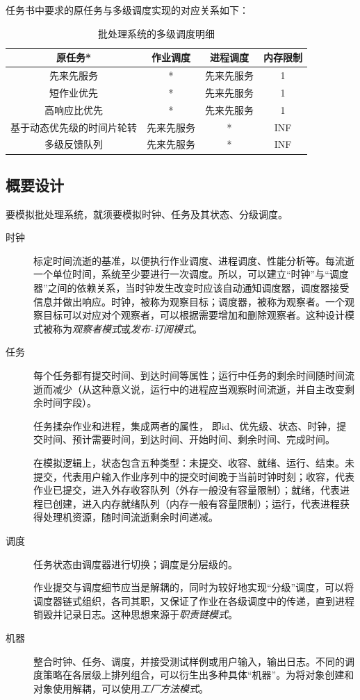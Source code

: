 \documentclass[UTF8]{ctexart}
\begin{document}
任务书中要求的原任务与多级调度实现的对应关系如下：
\begin{table}[htbp]
    \caption{批处理系统的多级调度明细}
    \centering
    \begin{tabular}{cccc}
        \toprule
        原任务*          & 作业调度  & 进程调度  & 内存限制 \\
        \midrule
        先来先服务         & *     & 先来先服务 & 1    \\
        短作业优先         & *     & 先来先服务 & 1    \\
        高响应比优先        & *     & 先来先服务 & 1    \\
        \midrule
        基于动态优先级的时间片轮转 & 先来先服务 & *     & INF  \\
        多级反馈队列        & 先来先服务 & *     & INF  \\
        \bottomrule
    \end{tabular}
    \qquad
\end{table}

\subsection{概要设计} \label{v0}

要模拟批处理系统，就须要模拟时钟、任务及其状态、分级调度。

\begin{description}
    \item[时钟] 标定时间流逝的基准，以便执行作业调度、进程调度、性能分析等。每流逝一个单位时间，系统至少要进行一次调度。所以，可以建立“时钟”与“调度器”之间的依赖关系，当时钟发生改变时应该自动通知调度器，调度器接受信息并做出响应。时钟，被称为观察目标；调度器，被称为观察者。一个观察目标可以对应对个观察者，可以根据需要增加和删除观察者。这种设计模式被称为\emph{观察者模式}或\emph{发布-订阅模式}。
    \item[任务] 每个任务都有提交时间、到达时间等属性；运行中任务的剩余时间随时间流逝而减少（从这种意义说，运行中的进程应当观察时间流逝，并自主改变剩余时间字段）。

        任务揉杂作业和进程，集成两者的属性，
        即id、优先级、状态、时钟，提交时间、预计需要时间，到达时间、开始时间、剩余时间、完成时间。

        在模拟逻辑上，状态包含五种类型：未提交、收容、就绪、运行、结束。未提交，代表用户输入作业序列中的提交时间晚于当前时钟时刻；收容，代表作业已提交，进入外存收容队列（外存一般没有容量限制）；就绪，代表进程已创建，进入内存就绪队列（内存一般有容量限制）；运行，代表进程获得处理机资源，随时间流逝剩余时间递减。
    \item[调度] 任务状态由调度器进行切换；调度是分层级的。

        作业提交与调度细节应当是解耦的，同时为较好地实现“分级”调度，可以将调度器链式组织，各司其职，又保证了作业在各级调度中的传递，直到进程销毁并记录日志。这种思想来源于\emph{职责链模式}。

    \item[机器] 整合时钟、任务、调度，并接受测试样例或用户输入，输出日志。不同的调度策略在各层级上排列组合，可以衍生出多种具体“机器”。为将对象创建和对象使用解耦，可以使用\emph{工厂方法模式}。
\end{description}
\end{document}
